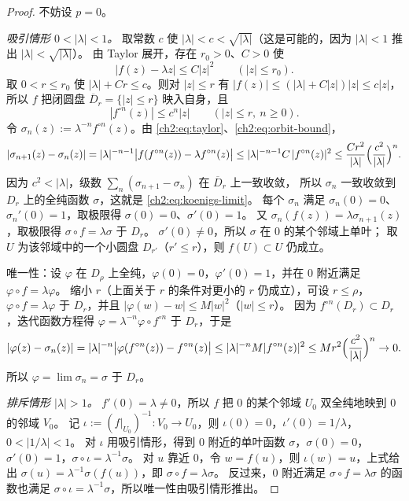 \begin{proof}
不妨设 $p=0$。

\emph{吸引情形 $0<|\lambda|<1$。}
取常数 $c$ 使 $|\lambda|<c<\sqrt{|\lambda|}$（这是可能的，因为 $|\lambda|<1$ 推出 $|\lambda|<\sqrt{|\lambda|}$）。
由 Taylor 展开，存在 $r_0>0$、$C>0$ 使
\begin{equation}\label{ch2:eq:taylor}
  |f(z)-\lambda z|\le C|z|^2\qquad(|z|\le r_0).
\end{equation}
取 $0<r\le r_0$ 使 $|\lambda|+Cr\le c$。则对 $|z|\le r$ 有 $|f(z)|\le(|\lambda|+C|z|)|z|\le c|z|$，
所以 $f$ 把闭圆盘 $\overline D_r=\{|z|\le r\}$ 映入自身，且
\begin{equation}\label{ch2:eq:orbit-bound}
  |f^{\circ n}(z)|\le c^n|z|\qquad(|z|\le r,\ n\ge0).
\end{equation}
令 $\sigma_n(z):=\lambda^{-n}f^{\circ n}(z)$。由 \eqref{ch2:eq:taylor}、\eqref{ch2:eq:orbit-bound}，
\[
  |\sigma_{n+1}(z)-\sigma_n(z)|
  =|\lambda|^{-n-1}\bigl|f(f^{\circ n}(z))-\lambda f^{\circ n}(z)\bigr|
  \le|\lambda|^{-n-1}C\,|f^{\circ n}(z)|^2
  \le\frac{Cr^2}{|\lambda|}\Bigl(\frac{c^2}{|\lambda|}\Bigr)^{n}.
\]
因为 $c^2<|\lambda|$，级数 $\sum_n(\sigma_{n+1}-\sigma_n)$ 在 $\overline D_r$ 上一致收敛，
所以 $\sigma_n$ 一致收敛到 $D_r$ 上的全纯函数 $\sigma$，这就是 \eqref{ch2:eq:koenigs-limit}。
每个 $\sigma_n$ 满足 $\sigma_n(0)=0$、$\sigma_n'(0)=1$，取极限得 $\sigma(0)=0$、$\sigma'(0)=1$。
又 $\sigma_n(f(z))=\lambda\sigma_{n+1}(z)$，取极限得 $\sigma\circ f=\lambda\sigma$ 于 $D_r$。
$\sigma'(0)\ne0$，所以 $\sigma$ 在 $0$ 的某个邻域上单叶；
取 $U$ 为该邻域中的一个小圆盘 $D_{r'}$（$r'\le r$），则 $f(U)\subset U$ 仍成立。

唯一性：设 $\varphi$ 在 $D_\rho$ 上全纯，$\varphi(0)=0$，$\varphi'(0)=1$，并在 $0$ 附近满足 $\varphi\circ f=\lambda\varphi$。
缩小 $r$（上面关于 $r$ 的条件对更小的 $r$ 仍成立），可设 $r\le\rho$，$\varphi\circ f=\lambda\varphi$ 于 $D_r$，并且 $|\varphi(w)-w|\le M|w|^2$（$|w|\le r$）。
因为 $f^{\circ n}(D_r)\subset D_r$，迭代函数方程得 $\varphi=\lambda^{-n}\varphi\circ f^{\circ n}$ 于 $D_r$，于是
\[
  |\varphi(z)-\sigma_n(z)|=|\lambda|^{-n}\bigl|\varphi(f^{\circ n}(z))-f^{\circ n}(z)\bigr|
  \le|\lambda|^{-n}M|f^{\circ n}(z)|^2\le Mr^2\Bigl(\frac{c^2}{|\lambda|}\Bigr)^n\to0 .
\]
所以 $\varphi=\lim\sigma_n=\sigma$ 于 $D_r$。

\emph{排斥情形 $|\lambda|>1$。}
$f'(0)=\lambda\ne0$，所以 $f$ 把 $0$ 的某个邻域 $U_0$ 双全纯地映到 $0$ 的邻域 $V_0$。
记 $\iota:=(f|_{U_0})^{-1}:V_0\to U_0$，则 $\iota(0)=0$，$\iota'(0)=1/\lambda$，$0<|1/\lambda|<1$。
对 $\iota$ 用吸引情形，得到 $0$ 附近的单叶函数 $\sigma$，$\sigma(0)=0$，$\sigma'(0)=1$，$\sigma\circ \iota=\lambda^{-1}\sigma$。
对 $u$ 靠近 $0$，令 $w=f(u)$，则 $\iota(w)=u$，上式给出 $\sigma(u)=\lambda^{-1}\sigma(f(u))$，即 $\sigma\circ f=\lambda\sigma$。
反过来，$0$ 附近满足 $\sigma\circ f=\lambda\sigma$ 的函数也满足 $\sigma\circ \iota=\lambda^{-1}\sigma$，所以唯一性由吸引情形推出。
\end{proof}

